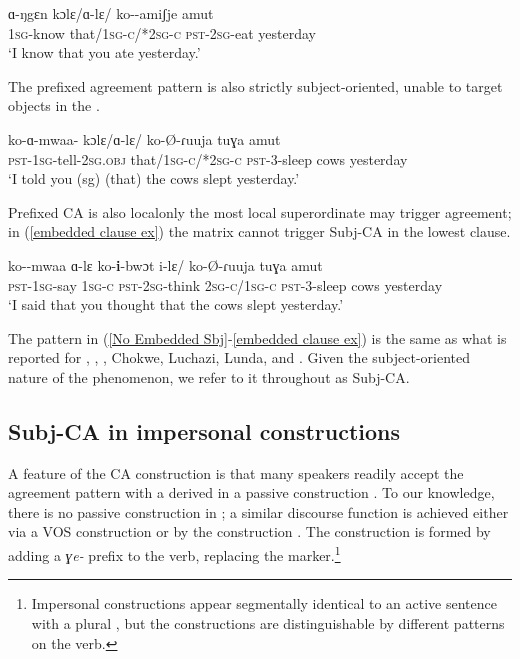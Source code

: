 \documentclass[output=paper,newtxmath,modfonts,nonflat,hidelinks]{langsci/langscibook}
\begin{document}
\ea \label{No Embedded Sbj}
\gll ɑ-ŋgɛn kɔlɛ/ɑ-lɛ/ ko--amiʃje amut \\
1\textsc{sg}-know that/1\textsc{sg-c/*}2\textsc{sg-c} \textsc{pst}-2\textsc{sg}-eat yesterday \\
\glt `I know that you ate yesterday.'
\z

\noindent The prefixed agreement pattern is also strictly subject-oriented, unable to target objects in the .

\ea
\gll ko-ɑ-mwaa- kɔlɛ/ɑ-lɛ/ ko-\O-ɾuuja tuɣa amut \\
\textsc{pst}-1\textsc{sg}-tell-2\textsc{sg}.\textsc{obj} that/1\textsc{sg-c/*}2\textsc{sg-c} \textsc{pst}-3-sleep cows yesterday \\
\glt `I told you (sg) (that) the cows slept yesterday.'
\z

\noindent Prefixed CA is also local\textemdash only the most local superordinate  may trigger agreement; in (\ref{embedded clause ex}) the matrix  cannot trigger Subj-CA in the lowest clause.

\ea \label{embedded clause ex}
\gll ko--mwaa ɑ-lɛ ko-\textbf{i}-bwɔt i-lɛ/ ko-\O-ɾuuja tuɣa amut\\
\textsc{pst}-1\textsc{sg}-say 1\textsc{sg-c} \textsc{pst}-2\textsc{sg}-think 2\textsc{sg-c/}1\textsc{sg-c} \textsc{pst}-3-sleep cows yesterday\\
\glt `I said that you thought that the cows slept yesterday.'
\z

\noindent The pattern in (\ref{No Embedded Sbj}-\ref{embedded clause ex}) is the same as what is reported for  \citep{Diercks:2013},  \citep{LetsholoSafir:2017},  \citep{Torrence:2016}, Chokwe, Luchazi, Lunda, and  \citep{Kawasha:2007}. Given the subject-oriented nature of the phenomenon, we refer to it throughout as Subj-CA.

\subsection{Subj-CA in impersonal constructions} \label{impersonals} \label{NoImpersonalSubj-CA}

A feature of the  CA construction is that many speakers readily accept the agreement pattern with a derived  in a passive construction \citep{Diercks:2010, Diercks:2013}. To our knowledge, there is no passive construction in ; a similar discourse function is achieved either via a VOS construction or by the  construction \citep[cf.][]{Payne:2011}. The  construction is formed by adding a \textit{ɣe-} prefix to the verb, replacing the  marker.\footnote{Impersonal constructions appear segmentally identical to an active sentence with a  plural , but the constructions are distinguishable by different  patterns on the verb.} 
\end{document}
